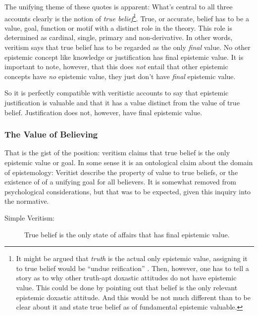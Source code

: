 \documentclass[12pt,numbers=noenddot]{scrartcl}
\begin{document}
The unifying theme of these quotes is apparent: What’s central to all three accounts clearly is the notion of \emph{true belief}\footnote{It might be argued that \emph{truth} is the actual only epistemic value, assigning it to true belief would be “undue reification” \autocite{Pritchard2014}. Then, however, one has to tell a story as to why other truth-apt doxastic attitudes do not have epistemic value. This could be done by pointing out that belief is the only relevant epistemic doxastic attitude. And this would be not much different than to be clear about it and state true belief as of fundamental epistemic valuable.}. True, or accurate, belief has to be a value, goal, function or motif with a distinct role in the theory. This role is determined as cardinal, single, primary and non-derivative. In other words, veritism says that true belief has to be regarded as the only \emph{final} value. No other epistemic concept like knowledge or justification has final epistemic value. It is important to note, however, that this does \emph{not} entail that other epistemic concepts have \emph{no} epistemic value, they just don’t have \emph{final} epistemic value.

So it is perfectly compatible with veritistic accounts to say that epistemic justification is valuable and that it has a value distinct from the value of true belief. Justification does not, however, have final epistemic value.

\subsubsection{The Value of Believing}
That is the gist of the position: veritism claims that true belief is the only epistemic value or goal. In some sense it is an ontological claim about the domain of epistemology: Veritist describe the property of value to true beliefs, or the existence of of a unifying goal for all believers. It is somewhat removed from psychological considerations, but that was to be expected, given this inquiry into the normative.

\begin{description}
    \item[Simple Veritism:] True belief is the only state of affairs that has final epistemic value.
\end{description}

\end{document}
